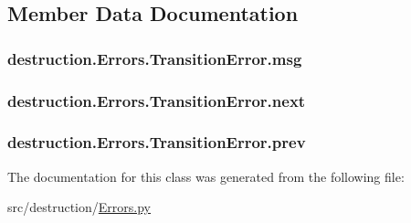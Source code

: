 \subsection{Member Data Documentation}
\hypertarget{classdestruction_1_1_errors_1_1_transition_error_a14f13180b917916938987f96bc0d9c35}{
\subsubsection[{msg}]{\setlength{\rightskip}{0pt plus 5cm}destruction.\-Errors.\-Transition\-Error.\-msg}}\label{classdestruction_1_1_errors_1_1_transition_error_a14f13180b917916938987f96bc0d9c35}
\hypertarget{classdestruction_1_1_errors_1_1_transition_error_ac828971324ebd580a8b2f4af26003953}{
\subsubsection[{next}]{\setlength{\rightskip}{0pt plus 5cm}destruction.\-Errors.\-Transition\-Error.\-next}}\label{classdestruction_1_1_errors_1_1_transition_error_ac828971324ebd580a8b2f4af26003953}
\hypertarget{classdestruction_1_1_errors_1_1_transition_error_a83ab31fda6af643f87cc710f917a7673}{
\subsubsection[{prev}]{\setlength{\rightskip}{0pt plus 5cm}destruction.\-Errors.\-Transition\-Error.\-prev}}\label{classdestruction_1_1_errors_1_1_transition_error_a83ab31fda6af643f87cc710f917a7673}


The documentation for this class was generated from the following file\-:\begin{DoxyCompactItemize}
\item 
src/destruction/\hyperlink{_errors_8py}{Errors.\-py}\end{DoxyCompactItemize}
